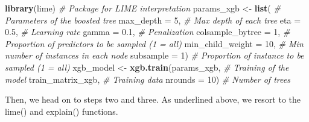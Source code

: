 \documentclass[]{krantz}
\makeatletter
\newenvironment{Shaded}{\begin{snugshade}}{\end{snugshade}}
\newcommand{\CommentTok}[1]{\textcolor[rgb]{0.37,0.37,0.37}{\textit{#1}}}
\newcommand{\DataTypeTok}[1]{\textcolor[rgb]{0.27,0.27,0.27}{#1}}
\newcommand{\DecValTok}[1]{\textcolor[rgb]{0.06,0.06,0.06}{#1}}
\newcommand{\FloatTok}[1]{\textcolor[rgb]{0.06,0.06,0.06}{#1}}
\newcommand{\KeywordTok}[1]{\textcolor[rgb]{0.27,0.27,0.27}{\textbf{#1}}}
\newcommand{\NormalTok}[1]{#1}
\newcommand{\StringTok}[1]{\textcolor[rgb]{0.5,0.5,0.5}{#1}}
\newenvironment{kframe}{%
\medskip{}
\setlength{\fboxsep}{.8em}
 \def\at@end@of@kframe{}%
 \ifinner\ifhmode%
  \def\at@end@of@kframe{\end{minipage}}%
  \begin{minipage}{\columnwidth}%
 \fi\fi%
 \def\FrameCommand##1{\hskip\@totalleftmargin \hskip-\fboxsep
 \colorbox{shadecolor}{##1}\hskip-\fboxsep
     \hskip-\linewidth \hskip-\@totalleftmargin \hskip\columnwidth}%
 \MakeFramed {\advance\hsize-\width
   \@totalleftmargin\z@ \linewidth\hsize
   \@setminipage}}%
 {\par\unskip\endMakeFramed%
 \at@end@of@kframe}
\renewenvironment{Shaded}{\begin{kframe}}{\end{kframe}}
\theoremstyle{definition}
\theoremstyle{definition}
\theoremstyle{definition}
\theoremstyle{remark}
\makeatother
\begin{document}
\begin{Shaded}
\begin{Highlighting}[]
\KeywordTok{library}\NormalTok{(lime)                              }\CommentTok{# Package for LIME interpretation}
\NormalTok{params_xgb <-}\StringTok{ }\KeywordTok{list}\NormalTok{(                        }\CommentTok{# Parameters of the boosted tree}
    \DataTypeTok{max_depth =} \DecValTok{5}\NormalTok{,                         }\CommentTok{# Max depth of each tree}
    \DataTypeTok{eta =} \FloatTok{0.5}\NormalTok{,                             }\CommentTok{# Learning rate }
    \DataTypeTok{gamma =} \FloatTok{0.1}\NormalTok{,                           }\CommentTok{# Penalization}
    \DataTypeTok{colsample_bytree =} \DecValTok{1}\NormalTok{,                  }\CommentTok{# Proportion of predictors to be sampled (1 = all)}
    \DataTypeTok{min_child_weight =} \DecValTok{10}\NormalTok{,                 }\CommentTok{# Min number of instances in each node}
    \DataTypeTok{subsample =} \DecValTok{1}\NormalTok{)                         }\CommentTok{# Proportion of instance to be sampled (1 = all)}
\NormalTok{xgb_model <-}\StringTok{ }\KeywordTok{xgb.train}\NormalTok{(params_xgb,         }\CommentTok{# Training of the model}
\NormalTok{                       train_matrix_xgb,   }\CommentTok{# Training data}
                       \DataTypeTok{nrounds =} \DecValTok{10}\NormalTok{)       }\CommentTok{# Number of trees}
\end{Highlighting}
\end{Shaded}

\normalsize

Then, we head on to steps two and three. As underlined above, we resort
to the lime() and explain() functions.

\footnotesize
\end{document}
